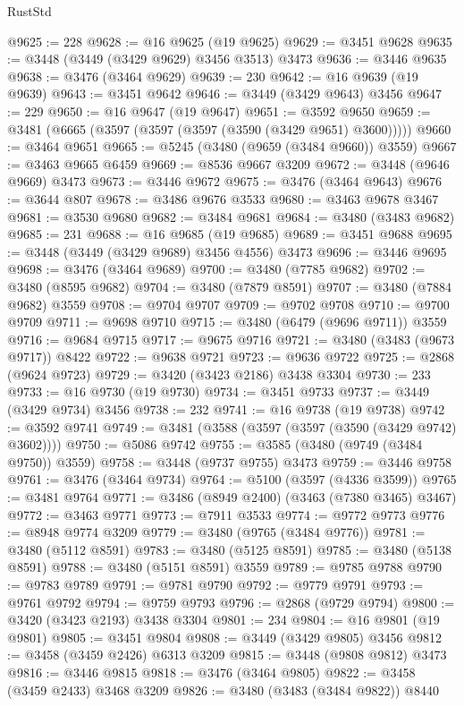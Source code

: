 \begin{lexlean}{RustStd}
\begin{coremodule}
{\begin{coremodule}
{{{{{{{{{{{{{{{{{{{{{{{{{{{{{{{{{{{{{{{{{{{{{{{{{{{{{{{{{{{{{{{{{{{{{{{{{{{{{{{{{{{{{@9625 := 228
@9628 := @16 @9625 (@19 @9625)
@9629 := @3451 @9628
@9635 := @3448 (@3449 (@3429 @9629) @3456 @3513) @3473
@9636 := @3446 @9635
@9638 := @3476 (@3464 @9629)
@9639 := 230
@9642 := @16 @9639 (@19 @9639)
@9643 := @3451 @9642
@9646 := @3449 (@3429 @9643) @3456
@9647 := 229
@9650 := @16 @9647 (@19 @9647)
@9651 := @3592 @9650
@9659 := @3481 (@6665 (@3597 (@3597 (@3597 (@3590 (@3429 @9651) @3600)))))
@9660 := @3464 @9651
@9665 := @5245 (@3480 (@9659 (@3484 @9660)) @3559)
@9667 := @3463 @9665 @6459
@9669 := @8536 @9667 @3209
@9672 := @3448 (@9646 @9669) @3473
@9673 := @3446 @9672
@9675 := @3476 (@3464 @9643)
@9676 := @3644 @807
@9678 := @3486 @9676 @3533
@9680 := @3463 @9678 @3467
@9681 := @3530 @9680
@9682 := @3484 @9681
@9684 := @3480 (@3483 @9682)
@9685 := 231
@9688 := @16 @9685 (@19 @9685)
@9689 := @3451 @9688
@9695 := @3448 (@3449 (@3429 @9689) @3456 @4556) @3473
@9696 := @3446 @9695
@9698 := @3476 (@3464 @9689)
@9700 := @3480 (@7785 @9682)
@9702 := @3480 (@8595 @9682)
@9704 := @3480 (@7879 @8591)
@9707 := @3480 (@7884 @9682) @3559
@9708 := @9704 @9707
@9709 := @9702 @9708
@9710 := @9700 @9709
@9711 := @9698 @9710
@9715 := @3480 (@6479 (@9696 @9711)) @3559
@9716 := @9684 @9715
@9717 := @9675 @9716
@9721 := @3480 (@3483 (@9673 @9717)) @8422
@9722 := @9638 @9721
@9723 := @9636 @9722
@9725 := @2868 (@9624 @9723)
@9729 := @3420 (@3423 @2186) @3438 @3304
@9730 := 233
@9733 := @16 @9730 (@19 @9730)
@9734 := @3451 @9733
@9737 := @3449 (@3429 @9734) @3456
@9738 := 232
@9741 := @16 @9738 (@19 @9738)
@9742 := @3592 @9741
@9749 := @3481 (@3588 (@3597 (@3597 (@3590 (@3429 @9742) @3602))))
@9750 := @5086 @9742
@9755 := @3585 (@3480 (@9749 (@3484 @9750)) @3559)
@9758 := @3448 (@9737 @9755) @3473
@9759 := @3446 @9758
@9761 := @3476 (@3464 @9734)
@9764 := @5100 (@3597 (@4336 @3599))
@9765 := @3481 @9764
@9771 := @3486 (@8949 @2400) (@3463 (@7380 @3465) @3467)
@9772 := @3463 @9771
@9773 := @7911 @3533
@9774 := @9772 @9773
@9776 := @8948 @9774 @3209
@9779 := @3480 (@9765 (@3484 @9776))
@9781 := @3480 (@5112 @8591)
@9783 := @3480 (@5125 @8591)
@9785 := @3480 (@5138 @8591)
@9788 := @3480 (@5151 @8591) @3559
@9789 := @9785 @9788
@9790 := @9783 @9789
@9791 := @9781 @9790
@9792 := @9779 @9791
@9793 := @9761 @9792
@9794 := @9759 @9793
@9796 := @2868 (@9729 @9794)
@9800 := @3420 (@3423 @2193) @3438 @3304
@9801 := 234
@9804 := @16 @9801 (@19 @9801)
@9805 := @3451 @9804
@9808 := @3449 (@3429 @9805) @3456
@9812 := @3458 (@3459 @2426) @6313 @3209
@9815 := @3448 (@9808 @9812) @3473
@9816 := @3446 @9815
@9818 := @3476 (@3464 @9805)
@9822 := @3458 (@3459 @2433) @3468 @3209
@9826 := @3480 (@3483 (@3484 @9822)) @8440
}}}}}}}}}}}}}}}}}}}}}}}}}}}}}}}}}}}}}}}}}}}}}}}}}}}}}}}}}}}}}}}}}}}}}}}}}}}}}}}}}}}}}
\end{coremodule}}
\end{coremodule}
\end{lexlean}
